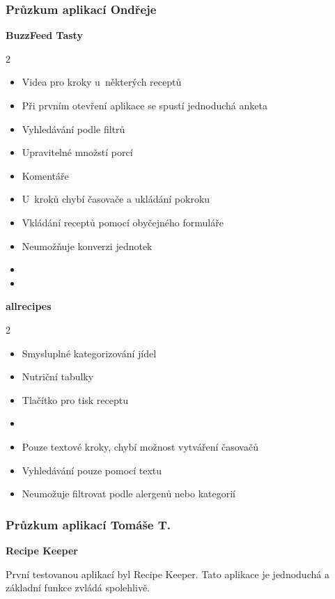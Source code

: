 \documentclass[a4paper, 11pt]{article}
\newcommand{\sss}[1]{\subsubsection{#1}} %
\newcommand{\plus}{\textbf{\color{ForestGreen}+}}
\renewcommand{\minus}{\textbf{\color{Red}-}}
\begin{document}
    \newpage

    \sss{Průzkum aplikací Ondřeje}

	\noindent\textbf{BuzzFeed Tasty}

    \begin{multicols}{2}
	\begin{itemize}
		\item[\textbf{\plus}] Videa pro kroky u~některých receptů
		\item[\textbf{\plus}] Při prvním otevření aplikace se spustí jednoduchá anketa
		\item[\textbf{\plus}] Vyhledávání podle filtrů
		\item[\textbf{\plus}] Upravitelné množstí porcí
		\item[\textbf{\plus}] Komentáře
		\item[\textbf{\minus}] U~kroků chybí časovače a ukládání pokroku
		\item[\textbf{\minus}] Vkládání receptů pomocí obyčejného formuláře
		\item[\textbf{\minus}] Neumožňuje konverzi jednotek
        \item[]
        \item[]
	\end{itemize}
    \end{multicols}

	\noindent\textbf{allrecipes}

    \begin{multicols}{2}
	\begin{itemize}
		\item[\textbf{\plus}] Smysluplné kategorizování jídel
		\item[\textbf{\plus}] Nutriční tabulky
		\item[\textbf{\plus}] Tlačítko pro tisk receptu
        \item[]
		\item[\textbf{\minus}] Pouze textové kroky, chybí možnost vytváření časovačů
		\item[\textbf{\minus}] Vyhledávání pouze pomocí textu
		\item[\textbf{\minus}] Neumožuje filtrovat podle alergenů nebo kategorií
	\end{itemize}
    \end{multicols}

    \sss{Průzkum aplikací Tomáše T.}

    \noindent\textbf{Recipe Keeper}

    První testovanou aplikací byl Recipe Keeper. Tato aplikace je jednoduchá a základní funkce zvládá spolehlivě.
\end{document}
